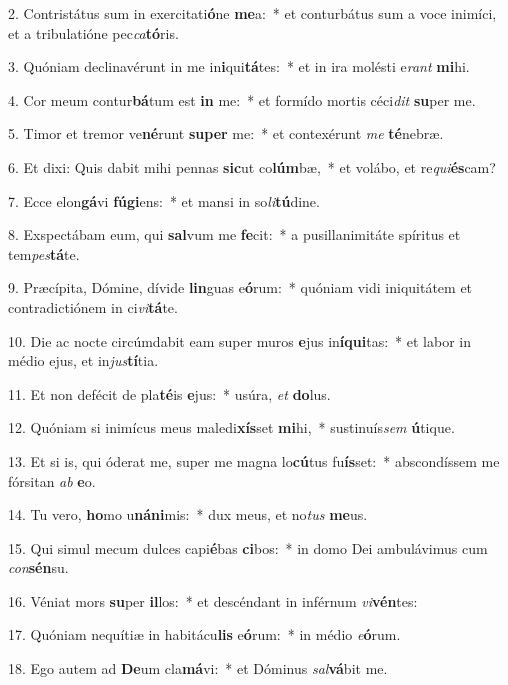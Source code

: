 2. Contristátus sum in exercitati\textbf{ó}ne \textbf{me}a:~*  et conturbátus sum a voce inimíci, et a tribulatióne pec\textit{ca}\textbf{tó}ris.\

3. Quóniam declinavérunt in me in\textbf{i}qui\textbf{tá}tes:~*  et in ira molésti e\textit{rant} \textbf{mi}hi.\

4. Cor meum contur\textbf{bá}tum est \textbf{in} me:~*  et formído mortis céci\textit{dit} \textbf{su}per me.\

5. Timor et tremor ve\textbf{né}runt \textbf{su}\textbf{per} me:~*  et contexérunt \textit{me} \textbf{té}nebræ.\

6. Et dixi: Quis dabit mihi pennas \textbf{sic}ut co\textbf{lúm}bæ,~*  et volábo, et re\textit{qui}\textbf{és}cam?\

7. Ecce elon\textbf{gá}vi \textbf{fú}\textbf{gi}ens:~*  et mansi in so\textit{li}\textbf{tú}dine.\

8. Exspectábam eum, qui \textbf{sal}vum me \textbf{fe}cit:~*  a pusillanimitáte spíritus et tem\textit{pes}\textbf{tá}te.\

9. Præcípita, Dómine, dívide \textbf{lin}guas e\textbf{ó}rum:~*  quóniam vidi iniquitátem et contradictiónem in ci\textit{vi}\textbf{tá}te.\

10. Die ac nocte circúmdabit eam super muros \textbf{e}jus in\textbf{í}\textbf{qui}tas:~*  et labor in médio ejus, et in\textit{jus}\textbf{tí}tia.\

11. Et non defécit de pla\textbf{té}is \textbf{e}jus:~*  usúra, \textit{et} \textbf{do}lus.\

12. Quóniam si inimícus meus maledi\textbf{xís}set \textbf{mi}hi,~*  sustinuís\textit{sem} \textbf{ú}tique.\

13. Et si is, qui óderat me, super me magna lo\textbf{cú}tus fu\textbf{ís}set:~*  abscondíssem me fórsitan \textit{ab} \textbf{e}o.\

14. Tu vero, \textbf{ho}mo u\textbf{ná}\textbf{ni}mis:~*  dux meus, et no\textit{tus} \textbf{me}us.\

15. Qui simul mecum dulces capi\textbf{é}bas \textbf{ci}bos:~*  in domo Dei ambulávimus cum \textit{con}\textbf{sén}su.\

16. Véniat mors \textbf{su}per \textbf{il}los:~*  et descéndant in inférnum \textit{vi}\textbf{vén}tes:\

17. Quóniam nequítiæ in habitácu\textbf{lis} e\textbf{ó}rum:~*  in médio \textit{e}\textbf{ó}rum.\

18. Ego autem ad \textbf{De}um cla\textbf{má}vi:~*  et Dóminus \textit{sal}\textbf{vá}bit me.\

